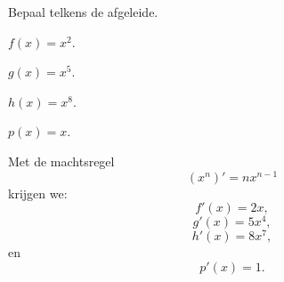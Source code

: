 \documentclass{ximera}
\begin{document}
\begin{oefening}[Machtsregel]{\oefB\ESS}

Bepaal telkens de afgeleide.

\begin{question}

\(
f(x)=x^2.
\)

\end{question}

\begin{question}

\(
g(x)=x^5.
\)

\end{question}

\begin{question}

\(
h(x)=x^8.
\)

\end{question}

\begin{question}

\(
p(x)=x.
\)

\end{question}

\begin{oplossing}

Met de machtsregel
\[
(x^n)'=nx^{n-1}
\]
krijgen we:
\[
f'(x)=2x,
\]
\[
g'(x)=5x^4,
\]
\[
h'(x)=8x^7,
\]
en
\[
p'(x)=1.
\]

\end{oplossing}

\end{oefening}


\end{document}
